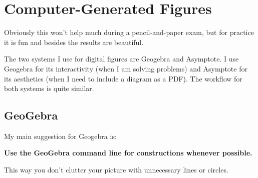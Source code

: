 \documentclass[11pt]{scrartcl}
\begin{document}
\section{Computer-Generated Figures}
Obviously this won't help much during a pencil-and-paper exam,
but for practice it is fun and besides the results are beautiful.

The two systems I use for digital figures are Geogebra and Asymptote.
I use Geogebra for its interactivity (when I am solving problems)
and Asymptote for its aesthetics (when I need to include a diagram as a PDF).
The workflow for both systems is quite similar.

\subsection{GeoGebra}
My main suggestion for Geogebra is:
\begin{tcolorbox}[plainbox]
  \bfseries\color{red}
  Use the GeoGebra command line for constructions whenever possible.
\end{tcolorbox}
This way you don't clutter your picture with unnecessary lines or circles.
\end{document}
